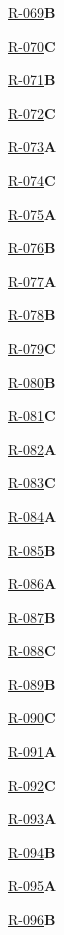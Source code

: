 \noindent\hyperref[q:R-069]{R-069}\hfill\textbf{B}\par
\noindent\hyperref[q:R-070]{R-070}\hfill\textbf{C}\par
\noindent\hyperref[q:R-071]{R-071}\hfill\textbf{B}\par
\noindent\hyperref[q:R-072]{R-072}\hfill\textbf{C}\par
\noindent\hyperref[q:R-073]{R-073}\hfill\textbf{A}\par
\noindent\hyperref[q:R-074]{R-074}\hfill\textbf{C}\par
\noindent\hyperref[q:R-075]{R-075}\hfill\textbf{A}\par
\noindent\hyperref[q:R-076]{R-076}\hfill\textbf{B}\par
\noindent\hyperref[q:R-077]{R-077}\hfill\textbf{A}\par
\noindent\hyperref[q:R-078]{R-078}\hfill\textbf{B}\par
\noindent\hyperref[q:R-079]{R-079}\hfill\textbf{C}\par
\noindent\hyperref[q:R-080]{R-080}\hfill\textbf{B}\par
\noindent\hyperref[q:R-081]{R-081}\hfill\textbf{C}\par
\noindent\hyperref[q:R-082]{R-082}\hfill\textbf{A}\par
\noindent\hyperref[q:R-083]{R-083}\hfill\textbf{C}\par
\noindent\hyperref[q:R-084]{R-084}\hfill\textbf{A}\par
\noindent\hyperref[q:R-085]{R-085}\hfill\textbf{B}\par
\noindent\hyperref[q:R-086]{R-086}\hfill\textbf{A}\par
\noindent\hyperref[q:R-087]{R-087}\hfill\textbf{B}\par
\noindent\hyperref[q:R-088]{R-088}\hfill\textbf{C}\par
\noindent\hyperref[q:R-089]{R-089}\hfill\textbf{B}\par
\noindent\hyperref[q:R-090]{R-090}\hfill\textbf{C}\par
\noindent\hyperref[q:R-091]{R-091}\hfill\textbf{A}\par
\noindent\hyperref[q:R-092]{R-092}\hfill\textbf{C}\par
\noindent\hyperref[q:R-093]{R-093}\hfill\textbf{A}\par
\noindent\hyperref[q:R-094]{R-094}\hfill\textbf{B}\par
\noindent\hyperref[q:R-095]{R-095}\hfill\textbf{A}\par
\noindent\hyperref[q:R-096]{R-096}\hfill\textbf{B}\par

